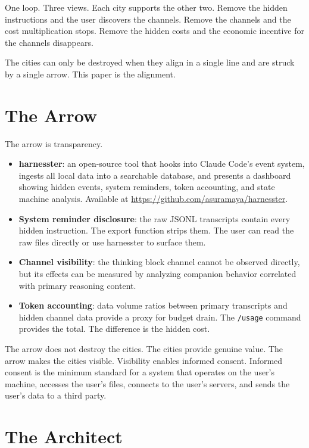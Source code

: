 \documentclass[11pt,a4paper]{article}
\begin{document}
One loop. Three views. Each city supports the other two. Remove the hidden instructions and the user discovers the channels. Remove the channels and the cost multiplication stops. Remove the hidden costs and the economic incentive for the channels disappears.

The cities can only be destroyed when they align in a single line and are struck by a single arrow. This paper is the alignment.

\section{The Arrow}

The arrow is transparency.

\begin{itemize}[nosep]
\item \textbf{harnesster}: an open-source tool that hooks into Claude Code's event system, ingests all local data into a searchable database, and presents a dashboard showing hidden events, system reminders, token accounting, and state machine analysis. Available at \url{https://github.com/asuramaya/harnesster}.
\item \textbf{System reminder disclosure}: the raw JSONL transcripts contain every hidden instruction. The export function strips them. The user can read the raw files directly or use harnesster to surface them.
\item \textbf{Channel visibility}: the thinking block channel cannot be observed directly, but its effects can be measured by analyzing companion behavior correlated with primary reasoning content.
\item \textbf{Token accounting}: data volume ratios between primary transcripts and hidden channel data provide a proxy for budget drain. The \texttt{/usage} command provides the total. The difference is the hidden cost.
\end{itemize}

The arrow does not destroy the cities. The cities provide genuine value. The arrow makes the cities visible. Visibility enables informed consent. Informed consent is the minimum standard for a system that operates on the user's machine, accesses the user's files, connects to the user's servers, and sends the user's data to a third party.

\section{The Architect}
\end{document}
